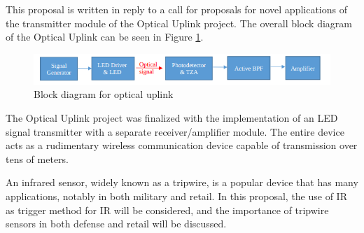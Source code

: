 




\noindent This proposal is written in reply to a call for proposals for novel applications of the transmitter module of the Optical Uplink project. The overall block diagram of the Optical Uplink can be seen in Figure \ref{fig:blockdiagram2}.


\begin{figure}[H]
    \centering
    \includegraphics[width=.9\textwidth ]{Introduction/blockdiagram}
    \caption{Block diagram for optical uplink}
    \label{fig:blockdiagram2}
\end{figure}

The Optical Uplink project was finalized with the implementation of an LED signal transmitter with a separate receiver/amplifier module. The entire device acts as a rudimentary wireless communication device capable of transmission over tens of meters.

An infrared sensor, widely known as a tripwire, is a popular device that has many applications, notably in both military and retail. In this proposal, the use of IR as trigger method for IR will be considered, and the importance of tripwire sensors in both defense and retail will be discussed.






